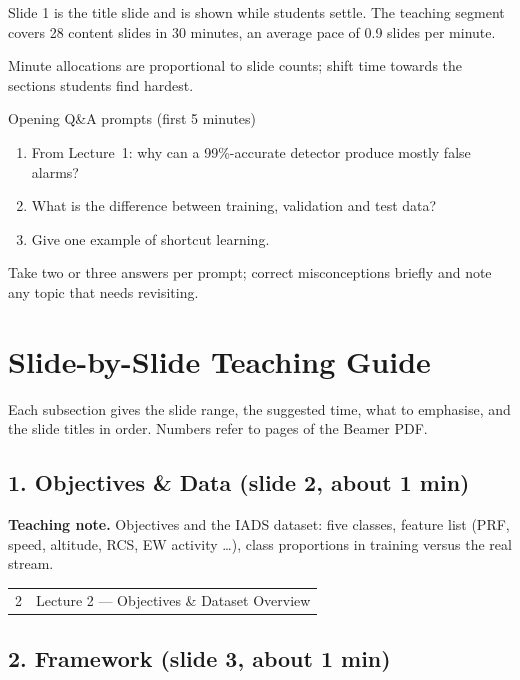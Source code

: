 \documentclass[11pt]{article}
\begin{document}
Slide 1 is the title slide and is shown while students settle. The teaching segment covers 28 content slides in 30 minutes, an average pace of 0.9 slides per minute. 

Minute allocations are proportional to slide counts; shift time towards the sections students find hardest.

\begin{instr}{Opening Q\&A prompts (first 5 minutes)}\begin{enumerate}\item From Lecture~1: why can a 99\%-accurate detector produce mostly false alarms?\item What is the difference between training, validation and test data?\item Give one example of shortcut learning.\end{enumerate}Take two or three answers per prompt; correct misconceptions briefly and note any topic that needs revisiting.\end{instr}

\section{Slide-by-Slide Teaching Guide}

Each subsection gives the slide range, the suggested time, what to emphasise, and the slide titles in order. Numbers refer to pages of the Beamer PDF.

\subsection{1. Objectives \& Data \normalfont\small\color{GreyN}(slide 2, about 1 min)}

\textbf{Teaching note.} Objectives and the IADS dataset: five classes, feature list (PRF, speed, altitude, RCS, EW activity \ldots), class proportions in training versus the real stream.

\begin{center}\small\renewcommand{\arraystretch}{1.1}\begin{tabularx}{\textwidth}{@{}r X@{}}2 & Lecture 2 --- Objectives \& Dataset Overview\\\end{tabularx}\end{center}

\subsection{2. Framework \normalfont\small\color{GreyN}(slide 3, about 1 min)}
\end{document}
